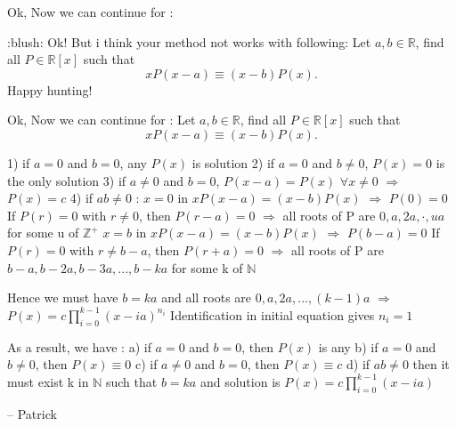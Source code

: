 \begin{solution}
	Ok, Now we can continue for : 
\begin{tcolorbox}:blush:  Ok! But i think your method not works with following:
Let $a,b\in\mathbb{R}$, find all $P\in\mathbb{R}[x]$ such that
\[xP(x-a)\equiv (x-b)P(x). \]
Happy hunting!  \end{tcolorbox}
\end{solution}



\begin{solution}
	\begin{tcolorbox}Ok, Now we can continue for : 
Let $a,b\in\mathbb{R}$, find all $P\in\mathbb{R}[x]$ such that
\[xP(x-a)\equiv (x-b)P(x). \]
\end{tcolorbox}

1) if $a=0$ and $b=0$, any $P(x)$ is solution
2) if $a=0$ and $b\neq 0$, $P(x)=0$ is the only solution
3) if $a\neq 0$ and $b=0$, $P(x-a)=P(x)$ $\forall x\neq 0$ $\Rightarrow $ $P(x)=c$
4) if $ab\neq 0$ :
$x=0$ in $xP(x-a)=(x-b)P(x)$ $\Rightarrow $ $P(0)=0$
If $P(r)=0$ with $r\neq 0$, then $P(r-a)=0$ $\Rightarrow $ all roots of P are $0,a, 2a, \cdot, ua$ for some u of $\mathbb{Z}^{+}$
$x=b$ in $xP(x-a)=(x-b)P(x)$ $\Rightarrow $ $P(b-a)=0$
If $P(r)=0$ with $r\neq b-a$, then $P(r+a)=0$ $\Rightarrow $ all roots of P are $b-a,b-2a, b-3a, ..., b-ka$ for some k of $\mathbb{N}$

Hence we must have $b=ka$ and all roots are $0, a, 2a, ..., (k-1)a$ $\Rightarrow $ $P(x)=c\prod_{i=0}^{k-1}(x-ia)^{n_{i}}$
Identification in initial equation gives $n_{i}=1$

As a result, we have :
a) if $a=0$ and $b=0$, then $P(x)$ is any
b) if $a=0$ and $b\neq 0$, then $P(x)\equiv 0$ 
c) if $a\neq 0$ and $b=0$,  then $P(x)\equiv c$
d) if $ab\neq 0$ then it must exist k in $\mathbb{N}$ such that $b=ka$ and solution is $P(x)=c\prod_{i=0}^{k-1}(x-ia)$

-- 
Patrick
\end{solution}



